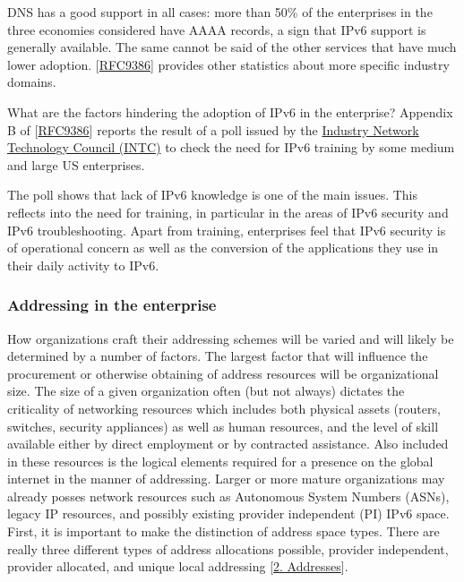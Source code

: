 \documentclass[
]{article}
\begin{document}
DNS has a good support in all cases: more than 50\% of the enterprises
in the three economies considered have AAAA records, a sign that IPv6
support is generally available. The same cannot be said of the other
services that have much lower adoption.
{[}\href{https://www.rfc-editor.org/info/rfc9386}{RFC9386}{]} provides
other statistics about more specific industry domains.

What are the factors hindering the adoption of IPv6 in the enterprise?
Appendix B of
{[}\href{https://www.rfc-editor.org/info/rfc9386}{RFC9386}{]} reports
the result of a poll issued by the
\href{https://industrynetcouncil.org/}{Industry Network Technology
Council (INTC)} to check the need for IPv6 training by some medium and
large US enterprises.

The poll shows that lack of IPv6 knowledge is one of the main issues.
This reflects into the need for training, in particular in the areas of
IPv6 security and IPv6 troubleshooting. Apart from training, enterprises
feel that IPv6 security is of operational concern as well as the
conversion of the applications they use in their daily activity to IPv6.

\subsubsection{Addressing in the
enterprise}\label{addressing-in-the-enterprise}

How organizations craft their addressing schemes will be varied and will
likely be determined by a number of factors. The largest factor that
will influence the procurement or otherwise obtaining of address
resources will be organizational size. The size of a given organization
often (but not always) dictates the criticality of networking resources
which includes both physical assets (routers, switches, security
appliances) as well as human resources, and the level of skill available
either by direct employment or by contracted assistance. Also included
in these resources is the logical elements required for a presence on
the global internet in the manner of addressing. Larger or more mature
organizations may already posses network resources such as Autonomous
System Numbers (ASNs), legacy IP resources, and possibly existing
provider independent (PI) IPv6 space. First, it is important to make the
distinction of address space types. There are really three different
types of address allocations possible, provider independent, provider
allocated, and unique local addressing {[}\hyperref[addresses]{2.
Addresses}{]}.
\end{document}
